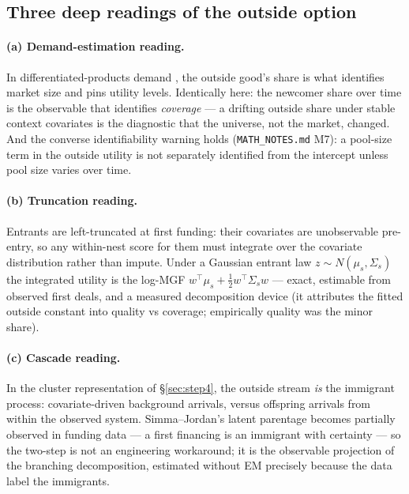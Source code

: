 \documentclass[11pt]{article}
\newcommand{\code}[1]{\texttt{#1}}
\numberwithin{assumption}{section}
\numberwithin{proposition}{section}
\numberwithin{remark}{section}
\begin{document}
\subsection{Three deep readings of the outside option}
\paragraph{(a) Demand-estimation reading.} In differentiated-products demand
\citep{berry1994}, the outside good's share is what identifies market size
and pins utility levels. Identically here: the newcomer share over time is
the observable that identifies \emph{coverage} --- a drifting outside share
under stable context covariates is the diagnostic that the universe, not
the market, changed. And the converse identifiability warning holds
(\code{MATH\_NOTES.md} M7): a pool-size term in the outside utility is not
separately identified from the intercept unless pool size varies over time.
\paragraph{(b) Truncation reading.} Entrants are left-truncated at first
funding: their covariates are unobservable pre-entry, so any within-nest
score for them must integrate over the covariate distribution rather than
impute. Under a Gaussian entrant law $z\sim N(\mu_s,\Sigma_s)$ the
integrated utility is the log-MGF $w^\top\mu_s+\tfrac12 w^\top\Sigma_s w$
--- exact, estimable from observed first deals, and a measured
decomposition device (it attributes the fitted outside constant into
quality vs coverage; empirically quality was the minor share).
\paragraph{(c) Cascade reading.} In the cluster representation of
\S\ref{sec:step4}, the outside stream \emph{is} the immigrant process:
covariate-driven background arrivals, versus offspring arrivals from within
the observed system. Simma--Jordan's latent parentage becomes partially
observed in funding data --- a first financing is an immigrant with
certainty --- so the two-step is not an engineering workaround; it is the
observable projection of the branching decomposition, estimated without EM
precisely because the data label the immigrants.
\end{document}
